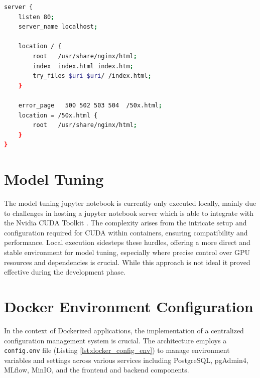 \begin{lstlisting}[language=bash, caption=Frontend Nginx Configuration, label={lst:frontend_nginx_configuration}]
server {
    listen 80;
    server_name localhost;

    location / {
        root   /usr/share/nginx/html;
        index  index.html index.htm;
        try_files $uri $uri/ /index.html;
    }

    error_page   500 502 503 504  /50x.html;
    location = /50x.html {
        root   /usr/share/nginx/html;
    }
}
\end{lstlisting}

\section{Model Tuning}
The model tuning jupyter notebook is currently only executed locally, mainly due to challenges in hosting a jupyter notebook server which is able to integrate with the Nvidia CUDA Toolkit \cite{NVIDIACUDAToolkit}. The complexity arises from the intricate setup and configuration required for CUDA within containers, ensuring compatibility and performance. Local execution sidesteps these hurdles, offering a more direct and stable environment for model tuning, especially where precise control over GPU resources and dependencies is crucial. While this approach is not ideal it proved effective during the development phase.


\section{Docker Environment Configuration}
\label{docker_config_env}

In the context of Dockerized applications, the implementation of a centralized configuration management system is crucial. The architecture employs a \texttt{config.env} file (Listing \ref{lst:docker_config_env}) to manage environment variables and settings across various services including PostgreSQL, pgAdmin4, MLflow, MinIO, and the frontend and backend components.

